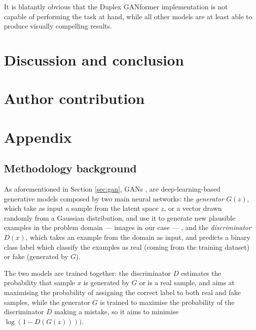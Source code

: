 \documentclass{article}
\begin{document}
    
	It is blatantly obvious that the Duplex GANformer implementation is not capable of performing the task at hand, while all other models are at least able to produce visually compelling results.
	
	
	\clearpage
	
	\section{Discussion and conclusion}%
	
	\section{Author contribution}
	
	\clearpage
	\appendix
	\section{Appendix}\label{sec:appendix}
	
	\subsection{Methodology background} \label{subsec:app_background}
	
	As aforementioned in Section \ref{sec:gan}, GANs \cite{goodfellow2014generative}, are 
	deep-learning-based generative models composed by two main neural networks: 
	the \textit{generator} ${G(z)}$, which take as input a sample from the latent space $z$, or a vector 
	drawn randomly from a Gaussian distribution, and use it to generate new plausible examples in the 
	problem domain — images in our case — , and the \textit{discriminator} ${D(x)}$, which takes an 
	example from the domain as input, and predicts a binary class label which classify the examples as 
	real (coming from the training dataset) or fake (generated by $G$). 
	
	The two models are trained together: the discriminator $D$ estimates the probability that 
	sample $x$ is generated by $G$ or is a real sample, and aims at maximising the probability of 
	assigning the correct label to both real and fake samples, while the generator $G$ is trained to 
	maximise the probability of the discriminator $D$ making a mistake, so it aims to minimise 
	$\log(1-D(G(z))))$.
	
\end{document}
